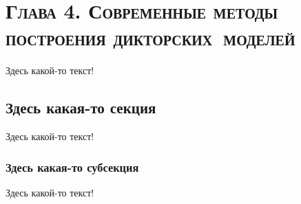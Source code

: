 \documentclass[12pt]{book}
\begin{document}
\chapter*{\textsc{Глава 4. Современные методы построения дикторских~моделей}}

\thispagestyle{fancy}

\large{Здесь какой-то текст!}

\section{Здесь какая-то секция}

\large{Здесь какой-то текст!}

\subsection{Здесь какая-то субсекция}

\large{Здесь какой-то текст!}
\end{document}

